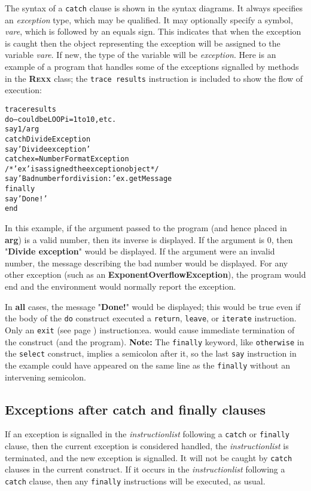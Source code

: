 The syntax of a \texttt{catch} clause is shown in the syntax diagrams.
It always specifies an \emph{exception} type, which may be
qualified.  It may optionally specify a symbol, \emph{vare}, which
is followed by an equals sign.  This indicates that when the exception
is caught then the object representing the exception will be assigned to
the variable \emph{vare}.  If new, the type of the variable will be
\emph{exception}.
 Here is an example of a program that handles some of the exceptions
signalled by methods in the \textbf{R\textsc{exx}} class; the \texttt{trace
results} instruction is included to show the flow of execution:
\begin{alltt}
trace results
do                -- could be LOOP i=1 to 10, etc.
  say 1/arg
catch DivideException
  say 'Divide exception'
catch ex=NumberFormatException
  /* 'ex' is assigned the exception object */
  say 'Bad number for division:' ex.getMessage
finally
  say 'Done!'
end
\end{alltt}
In this example, if the argument passed to the program (and hence
placed in \textbf{arg}) is a valid number, then its inverse is
displayed.  If the argument is 0, then "\textbf{Divide
exception}" would be displayed.  If the argument were an invalid
number, the message describing the bad number would be displayed.
For any other exception (such as an \textbf{ExponentOverflowException}),
the program would end and the environment would normally report the
exception.
 
In \textbf{all} cases, the message "\textbf{Done!}" would be
displayed; this would be true even if the body of the \texttt{do}
construct executed a \texttt{return}, \texttt{leave}, or
\texttt{iterate} instruction.  Only an  \texttt{exit} (see page \pageref{refexit}) 
instruction:ea. would cause immediate termination of the construct (and
the program).
\textbf{Note: }The \texttt{finally} keyword, like \texttt{otherwise} in the
\texttt{select} construct, implies a semicolon after it, so the last
\texttt{say} instruction in the example could have appeared on the same
line as the \texttt{finally} without an intervening semicolon.
\subsection{Exceptions after catch and finally clauses}
 
If an exception is signalled in the \emph{instructionlist} following
a \texttt{catch} or \texttt{finally} clause, then the current exception
is considered handled, the \emph{instructionlist} is terminated, and
the new exception is signalled.  It will not be caught by \texttt{catch}
clauses in the current construct.  If it occurs in the
\emph{instructionlist} following a \texttt{catch} clause, then any
\texttt{finally} instructions will be executed, as usual.
 
